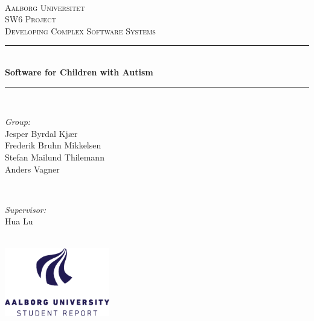 %
\thispagestyle{empty}

\newcommand{\HRule}{\rule{\linewidth}{0.5mm}} %

\begin{center}
\textsc{}\\[0.5cm]

\textsc{\LARGE Aalborg Universitet}\\[0.8cm]
\textsc{\Large SW6 Project}\\[0.4cm]
\textsc{\large Developing Complex Software Systems}\\[0.4cm]

\HRule \\[0.4cm]
{ \huge \bfseries Software for Children with Autism}\\[0cm]
\HRule \\[0.8cm]
\begin{minipage}{0.4\textwidth}
\begin{flushleft} \large
\emph{Group:}\\
Jesper Byrdal Kjær\\
Frederik Bruhn Mikkelsen\\
Stefan Mailund Thilemann\\
Anders Vagner
\end{flushleft}
\end{minipage} 
~
\begin{minipage}{0.4\textwidth}
\begin{flushright} \large
\emph{Supervisor:}\\
Hua Lu
\end{flushright}
\end{minipage}\\[1.5cm]



\vfill
\includegraphics[height=3cm]{figures/aauLogoEnStudent.png}
\vfill

\end{center}

